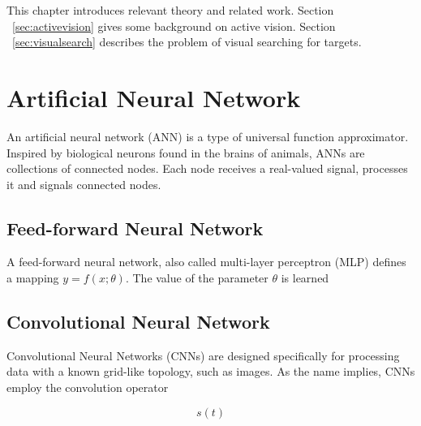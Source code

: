 This chapter introduces relevant theory and related work.
Section ~\ref{sec:activevision} gives some background on active vision.
Section ~\ref{sec:visualsearch} describes the problem of visual searching for targets.



\section{Artificial Neural Network}

An artificial neural network (ANN) is a type of universal function approximator.
Inspired by biological neurons found in the brains of animals, ANNs are collections of connected nodes.
Each node receives a real-valued signal, processes it and signals connected nodes.



\subsection{Feed-forward Neural Network}

A feed-forward neural network, also called multi-layer perceptron (MLP) defines a mapping \(y = f(x; \theta)\).
The value of the parameter \(\theta\) is learned  

\cite{goodfellow_deep_2016}

\subsection{Convolutional Neural Network}

Convolutional Neural Networks (CNNs) are designed specifically for processing data with a known grid-like topology, such as images.
As the name implies, CNNs employ the convolution operator

\[
    s(t) 
\]

\cite{goodfellow_deep_2016}


